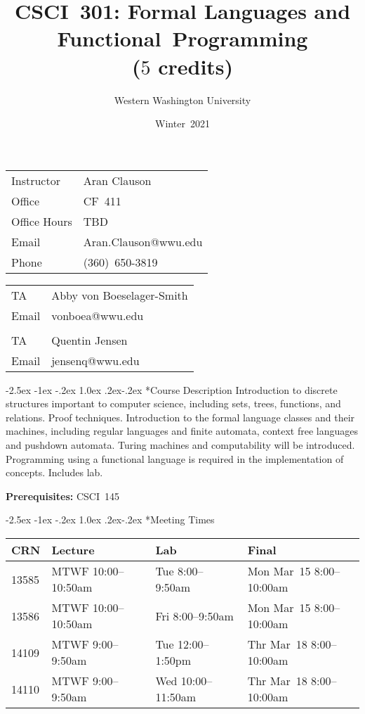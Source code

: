 \documentclass[letterpaper,12pt]{article}
\title{CSCI~301: Formal Languages and Functional~Programming\\
  \small ($5$ credits)}
\author{\small Western Washington University}
\date{\small Winter~2021}
\makeatletter
\renewcommand\section{%
  \@startsection {section}{1}{\z@}%
  {-2.5ex \@plus -1ex \@minus -.2ex}%
  {1.0ex \@plus.2ex\@minus-.2ex}%
  {\normalfont\Large\bfseries}}
\makeatother
\begin{document}
\maketitle

\begin{multicols}{2}
\begin{tabular}[t]{ll}
Instructor   & Aran Clauson \\
Office       & CF~411    \\
Office Hours & TBD       \\
Email        & Aran.Clauson@wwu.edu\\
Phone        & (360)~650-3819\\
\end{tabular}
\columnbreak
\begin{tabular}[t]{ll}
  TA    & Abby von Boeselager-Smith\\
  Email & vonboea@wwu.edu\\
  \\
  TA    & Quentin Jensen \\
  Email & jensenq@wwu.edu\\
\end{tabular}
\end{multicols}

\setlength{\parskip}{1ex}
\section*{Course Description}
 Introduction to discrete structures important to computer science, including
 sets, trees, functions, and relations. Proof techniques. Introduction to the
 formal language classes and their machines, including regular languages and
 finite automata, context free languages and pushdown automata. Turing machines
 and computability will be introduced. Programming using a functional language
 is required in the implementation of concepts. Includes lab.

{\small \textbf{Prerequisites:} CSCI~145}

\section*{Meeting Times}
\begin{center}
  \begin{tabular}{l|l|l|l}
    CRN   & Lecture  & Lab & Final \\ \hline
    13585 & MTWF 10:00--10:50am & Tue 8:00--9:50am   & Mon Mar~15 8:00--10:00am\\
    13586 & MTWF 10:00--10:50am & Fri 8:00--9:50am   & Mon Mar~15 8:00--10:00am\\
    14109 & MTWF 9:00--9:50am   & Tue 12:00--1:50pm  & Thr Mar~18 8:00--10:00am\\
    14110 & MTWF 9:00--9:50am   & Wed 10:00--11:50am & Thr Mar~18 8:00--10:00am\\
  \end{tabular}
\end{center}
\end{document}
